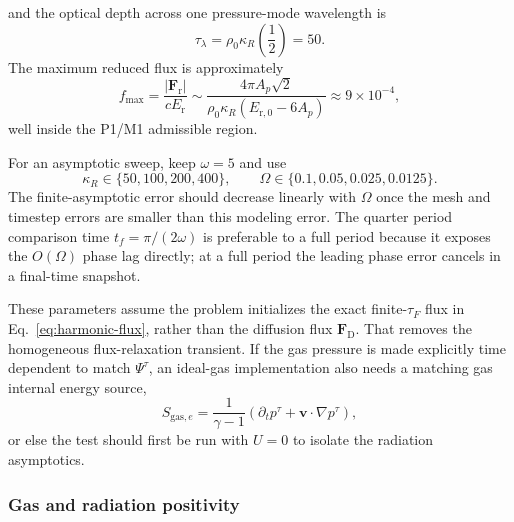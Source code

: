 \documentclass[11pt]{article}
\newcommand{\Grad}{\nabla}
\newcommand{\Er}{E_{\mathrm r}}
\newcommand{\Fr}{\bm{F}_{\mathrm r}}
\newcommand{\FrD}{\bm{F}_{\mathrm D}}
\newcommand{\Erzero}{E_{\mathrm r,0}}
\begin{document}
and the optical depth across one pressure-mode wavelength is
\begin{equation}
  \tau_\lambda=\rho_0\kappa_R\left(\frac{1}{2}\right)=50.
  \label{eq:recommended-wavelength-tau}
\end{equation}
The maximum reduced flux is approximately
\begin{equation}
  f_{\max}
  =
  \frac{|\Fr|}{c\Er}
  \sim
  \frac{4\pi A_p\sqrt{2}}{\rho_0\kappa_R(\Erzero-6A_p)}
  \approx 9\times10^{-4},
  \label{eq:recommended-reduced-flux}
\end{equation}
well inside the P1/M1 admissible region.

For an asymptotic sweep, keep \(\omega=5\) and use
\begin{equation}
  \kappa_R \in \{50,100,200,400\},
  \qquad
  \Omega \in \{0.1,0.05,0.025,0.0125\}.
  \label{eq:recommended-sweep}
\end{equation}
The finite-asymptotic error should decrease linearly with \(\Omega\) once the
mesh and timestep errors are smaller than this modeling error.  The quarter
period comparison time \(t_f=\pi/(2\omega)\) is preferable to a full period
because it exposes the \(O(\Omega)\) phase lag directly; at a full period the
leading phase error cancels in a final-time snapshot.

These parameters assume the problem initializes the exact finite-\(\tau_F\)
flux in Eq.~\eqref{eq:harmonic-flux}, rather than the diffusion flux
\(\FrD\).  That removes the homogeneous flux-relaxation transient.  If the
gas pressure is made explicitly time dependent to match
\(\Psi^\tau\), an ideal-gas implementation also needs a matching gas internal
energy source,
\begin{equation}
  S_{\mathrm{gas},e}
  =
  \frac{1}{\gamma-1}
  \left(\partial_t p^\tau+\bm{v}\cdot\Grad p^\tau\right),
  \label{eq:recommended-gas-energy-source}
\end{equation}
or else the test should first be run with \(U=0\) to isolate the radiation
asymptotics.

\subsubsection{Gas and radiation positivity}
\end{document}
